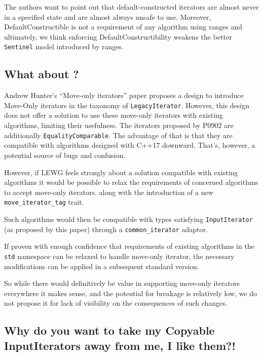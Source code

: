 \documentclass{wg21}
\begin{document}
The authors want to point out that default-constructed iterators are
almost never in a specified state and are almost always unsafe to use.
Moreover, DefaultConstructible is not a requirement of any algorithm
using ranges and ultimately, we think enforcing DefaultConstructibility
weakens the better \texttt{Sentinel} model introduced by ranges.

\hypertarget{what-about-p0902r0}{%
	\subsection{What about \cite{P0902}?}\label{what-about-p0902r0}}

Andrew Hunter's ``Move-only iterators'' paper proposes a design to
introduce Move-Only iterators in the taxonomy of
\texttt{LegacyIterator}. However, this design does not offer a solution
to use these move-only iterators with existing algorithms, limiting
their usefulness. The iterators proposed by P0902 are additionally
\texttt{EqualityComparable}. The advantage of that is that they are
compatible with algorithms designed with C++17 downward. That's,
however, a potential source of bugs and confusion.

However, if LEWG feels strongly about a solution compatible with
existing algorithms it would be possible to relax the requirements of
concerned algorithms to accept move-only iterators. along with the
introduction of a new \texttt{move\_iterator\_tag} trait.

Such algorithms would then be compatible with types satisfying
\texttt{InputIterator} (as proposed by this paper) through a
\texttt{common\_iterator} adaptor.

If proven with enough confidence that requirements of existing
algorithms in the \texttt{std} namespace can be relaxed to handle
move-only iterator, the necessary modifications can be applied in a
subsequent standard version.

So while there would definitively be value in supporting move-only
iterators everywhere it makes sense, and the potential for breakage is
relatively low, we do not propose it for lack of visibility on the
consequences of such changes.

\hypertarget{why-do-you-want-to-take-my-copyable-inputiterators-away-from-me-i-like-them}{%
	\subsection{Why do you want to take my Copyable InputIterators away from
		me, I like
		them?!}\label{why-do-you-want-to-take-my-copyable-inputiterators-away-from-me-i-like-them}}
\end{document}
